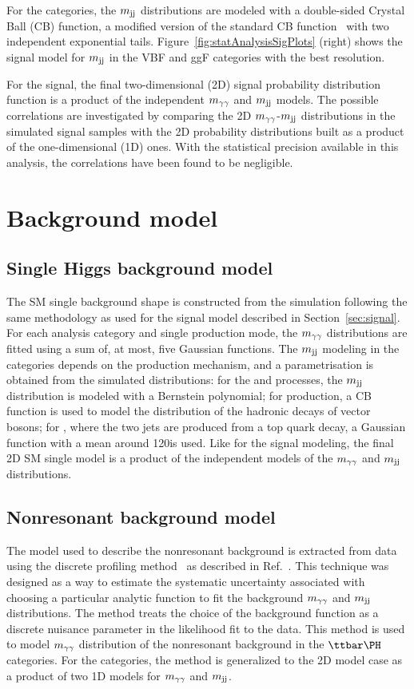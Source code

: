 \documentclass[11pt,twoside,a4paper,cmspaper,final,collab]{cms-tdr}
\begin{document}
For the \HH categories, the $m_\text{jj}$ distributions are modeled with a double-sided Crystal Ball (CB) function, a modified version of the standard CB function~\cite{CrystalBallRef}
with two independent exponential tails. Figure~\ref{fig:statAnalysisSigPlots} (right) shows the signal model for $m_\text{jj}$ in the VBF and ggF categories with the best resolution.

For the \HH signal, the final two-dimensional (2D) signal probability distribution function is a product of the independent $m_{\gamma\gamma}$ and $m_\text{jj}$ models.
The possible correlations are investigated by comparing the 2D $m_{\gamma\gamma}$-$m_\text{jj}$ distributions in the simulated signal samples
with the 2D probability distributions built as a product of the one-dimensional (1D) ones. With the statistical precision available in this analysis, the correlations have been found to be negligible.

\section{Background model}
\label{sec:background}
\subsection{Single Higgs background model}
\label{sec:singleHiggsbackground}
The SM single \PH background shape is constructed from
the simulation following the same methodology as used for the signal model described in Section~\ref{sec:signal}. For each analysis category and single \PH production mode,
 the $m_{\gamma\gamma}$ distributions are fitted using a sum
of, at most, five Gaussian functions. The $m_\text{jj}$ modeling in the \HH categories depends on the production mechanism, and a parametrisation is obtained from the 
simulated distributions: for the \ggH and \VBFH processes, the $m_\text{jj}$ distribution is modeled with a Bernstein polynomial; for \VH production, a CB function is used to model the distribution of the hadronic decays of vector bosons; for \ttH, where the two \cPqb jets are produced 
from a top quark decay, a Gaussian function with a mean around 120\GeV is used.
 Like for the signal modeling, the final 2D SM single \PH model is a product of the independent models of the $m_{\gamma\gamma}$ and $m_\text{jj}$ distributions.

\subsection{Nonresonant background model}
\label{sec:nonresbackground}
The model used to describe the nonresonant background is extracted from data using the discrete profiling method~\cite{DiscreteProfilingMethod}
as described in Ref.~\cite{Khachatryan:2014ira}. This
technique was designed as a way to estimate the systematic uncertainty
associated with choosing a particular analytic function to fit the
background $m_{\gamma\gamma}$ and $m_\text{jj}$ distributions. The method treats the choice of the
background function as a discrete nuisance parameter in the likelihood 
fit to the data. This method is used to model $m_{\gamma\gamma}$ distribution of the nonresonant background in the $\ttH$ categories. For the \HH categories, the method is generalized to the 2D model case as a product of two 1D models for $m_{\gamma\gamma}$ and $m_\text{jj}$.
\end{document}
